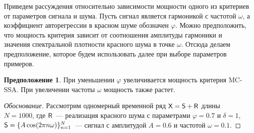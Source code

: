 \documentclass[specialist,
substylefile = spbu_report.rtx,
subf,href,colorlinks=true, 12pt]{disser}
\theoremstyle{definition}
\newtheorem{assumption}{Предположение}
\begin{document}
Приведем рассуждения относительно зависимости мощности одного из критериев от параметров сигнала и шума. Пусть сигнал является гармоникой с частотой $\omega$, а коэффициент авторегрессии в красном шуме обозначен $\varphi$.
Можно предположить, что мощность критерия зависит от соотношения амплитуды гармоники и значения спектральной плотности красного шума в точке $\omega$. Отсюда делаем предположение, которое будем использовать далее при выборе параметров примеров.

\begin{assumption}\label{statement1}
	При уменьшении $\varphi$ увеличивается мощность критерия MC-SSA. При увеличении частоты $\omega$ мощность также растет.
\end{assumption}
\begin{proof}[Обоснование]
		Рассмотрим одномерный временной ряд $\mathsf{X}=\mathsf{S} + \mathsf{R}$ длины $N=1000$, где $\mathsf{R}$~--- реализация красного шума с параметрами $\varphi=0.7$ и $\delta=1$, $\mathsf{S} = \{A\cos(2\pi n \omega)\}_{n=1}^N$~--- сигнал с амплитудой $A=0.6$ и частотой $\omega=0.1$.


\end{proof}
\end{document}
